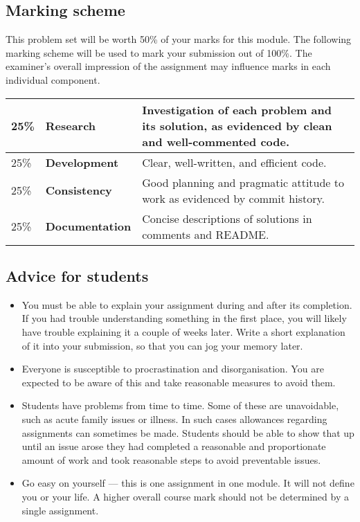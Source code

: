\documentclass[a4paper, 12pt]{exam}
\begin{document}
\subsection*{Marking scheme}
  This problem set will be worth 50\% of your marks for this module.
  The following marking scheme will be used to mark your submission out of 100\%.
  The examiner's overall impression of the assignment may influence marks in each individual component.

  \begin{center}
    \begin{tabular}{llp{8.4cm}}
      \toprule
      25\% & \textbf{Research} & Investigation of each problem and its solution, as evidenced by clean and well-commented code. \\
      \midrule
      25\% & \textbf{Development} & Clear, well-written, and efficient code. \\
      \midrule
      25\% & \textbf{Consistency} & Good planning and pragmatic attitude to work as evidenced by commit history. \\
      \midrule
      25\% & \textbf{Documentation} & Concise descriptions of solutions in comments and README. \\
      \bottomrule
    \end{tabular}
  \end{center}

  \subsection*{Advice for students}
  \begin{itemize}
    \item
      You must be able to explain your assignment during and after its completion.
      If you had trouble understanding something in the first place, you will likely have trouble explaining it a couple of weeks later.
      Write a short explanation of it into your submission, so that you can jog your memory later.
    \item
      Everyone is susceptible to procrastination and disorganisation.
      You are expected to be aware of this and take reasonable measures to avoid them.
    \item
      Students have problems from time to time.
      Some of these are unavoidable, such as acute family issues or illness.
      In such cases allowances regarding assignments can sometimes be made.
      Students should be able to show that up until an issue arose they had completed a reasonable and proportionate amount of work and took reasonable steps to avoid preventable issues.
    \item
      Go easy on yourself --- this is one assignment in one module.
      It will not define you or your life.
      A higher overall course mark should not be determined by a single assignment.
  \end{itemize}
\end{document}
